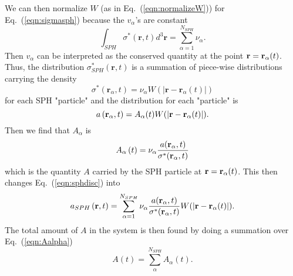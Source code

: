 \documentclass[aps,article]{revtex4}
\begin{document}
We can then normalize $W$ (as in Eq.\ (\ref{eqn:normalizeW})) for Eq.\ (\ref{eqn:sigmasph}) because the $v_{\alpha}$'s are constant
\begin{equation*}
\int_{SPH}\sigma ^{\ast }\left( \mathbf{r},t\right) d^{3}\mathbf{r=}%
\sum_{\alpha =1}^{N_{SPH}}\nu _{\alpha }.
\end{equation*}
Then $v_{\alpha}$ can be interpreted as the conserved quantity at the point ${\bf r}={\bf r}_{\alpha}(t)$.  Thus, the distribution $\sigma _{SPH}^{\ast }\left( \mathbf{r},t\right) $ is a summation of piece-wise distributions carrying the density
\begin{equation}
\sigma^{\ast }\left( \mathbf{r}_{\alpha},t\right)=\nu _{\alpha }W(|\mathbf{r}-\mathbf{r}_{\alpha }(t)|)
\end{equation}
for each SPH "particle" and the distribution for each "particle" is
\begin{equation}
a\left( \mathbf{r}_{\alpha},t\right)=A_{\alpha}(t)W(|{\bf r}-{\bf r}_{\alpha}(t)|).
\end{equation}
Then we find that $A_{\alpha}$ is
\begin{equation}\label{eqn:Aalpha}
A_{\alpha }\left( t\right) =\nu _{\alpha }\frac{a(\mathbf{r}_{\alpha },t)}{%
\sigma ^{\ast }(\mathbf{r}_{\alpha },t)}
\end{equation}	
which is the quantity $A$ carried by the SPH particle at ${\bf r}={\bf r}_{\alpha}(t)$. This then changes Eq.\ (\ref{eqn:sphdisc}) into
\begin{equation}\label{eqn:asphsub}
a_{SPH}\left({\bf r},t\right)=\sum_{\alpha=1}^{N_{SPH}}\nu _{\alpha }\frac{a(\mathbf{r}_{\alpha },t)}{%
\sigma ^{\ast }(\mathbf{r}_{\alpha },t)}W(|{\bf r}-{\bf r}_{\alpha}(t)|).
\end{equation}
The total amount of $A$ in the system is then found by doing a summation over Eq.\ (\ref{eqn:Aalpha})
\begin{equation}
A(t)=\sum_{\alpha}^{N_{SPH}}A_{\alpha}(t).
\end{equation}
\end{document}
